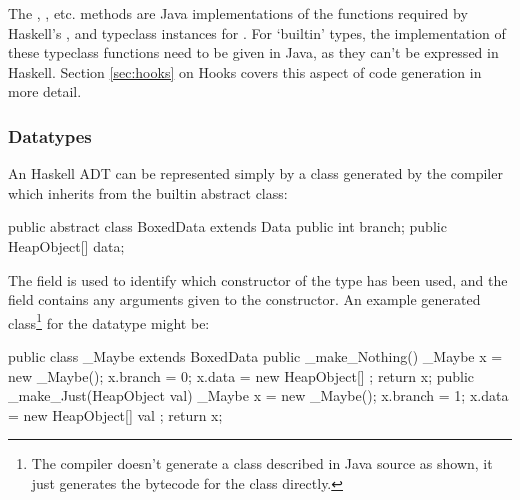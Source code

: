 \documentclass[dissertation.tex]{subfiles}
\begin{document}
{{{            

            The , , etc. methods are Java implementations of the functions required by Haskell's
            ,  and  typeclass instances for . For `builtin'
            types, the implementation of these typeclass functions need to be given in Java, as they can't be expressed
            in Haskell. Section \ref{sec:hooks} on Hooks covers this aspect of code generation in more detail.

        }
        \subsubsection{Datatypes}
        {
            
            An Haskell ADT can be represented simply by a class generated by the compiler which inherits from the
             builtin abstract class:

            \begin{javafigure}
            public abstract class BoxedData extends Data {
                public int branch;
                public HeapObject[] data;
            }
            \end{javafigure}

            The  field is used to identify which constructor of the type has been used, and the
             field contains any arguments given to the constructor. An example generated
            class\footnote{The compiler doesn't generate a class described in Java source as shown, it just
            generates the bytecode for the class directly.} for the datatype  might be:

            \begin{javafigure}
            public class _Maybe extends BoxedData {
                public _make_Nothing() {
                    _Maybe x = new _Maybe();
                    x.branch = 0;
                    x.data = new HeapObject[] {};
                    return x;
                }
                public _make_Just(HeapObject val) {
                    _Maybe x = new _Maybe();
                    x.branch = 1;
                    x.data = new HeapObject[] { val };
                    return x;
                }
            }
            \end{javafigure}

}}}
\end{document}

